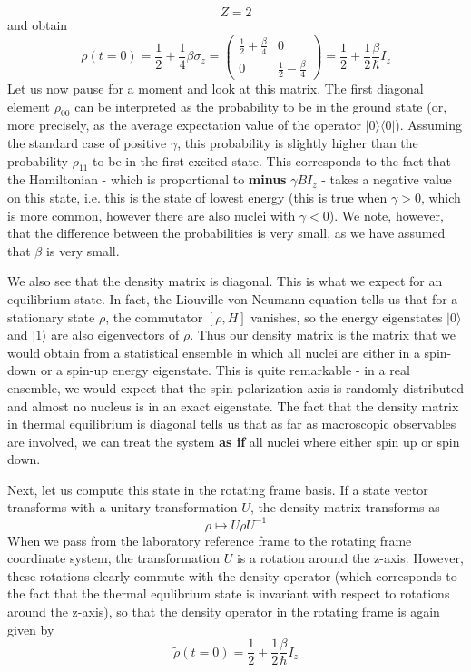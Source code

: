 \documentclass[a4paper, draft]{article}
\theoremstyle{own}
\theoremstyle{remark}
\begin{document}
$$
Z = 2
$$
and obtain
$$
\rho(t=0) = \frac{1}{2} + \frac{1}{4} \beta \sigma_z =
\begin{pmatrix}
\frac{1}{2} + \frac{\beta}{4} & 0 \\
0 & \frac{1}{2} - \frac{\beta}{4}
\end{pmatrix} = \frac{1}{2} + \frac{1}{2} \frac{\beta}{\hbar} I_z
$$
Let us now pause for a moment and look at this matrix. The first diagonal element $\rho_{00}$ can be interpreted as the probability to be in the ground state (or, more precisely, as the average expectation value of the operator $|0 \rangle \langle 0 |$). Assuming the standard case of positive $\gamma$, this probability is slightly higher than the probability $\rho_{11}$ to be in the first excited state. This corresponds to the fact that the Hamiltonian - which is proportional to {\bf minus} $\gamma B I_z$ - takes a negative value on this state, i.e. this is the state of lowest energy (this is true when $\gamma > 0$, which is more common, however there are also nuclei with $\gamma < 0$). We note, however, that the difference between the probabilities is very small, as we have assumed that $\beta$ is very small. 

We also see that the density matrix is diagonal. This is what we expect for an equilibrium state. In fact, the Liouville-von Neumann equation tells us that for a stationary state $\rho$, the commutator $[\rho, H]$ vanishes, so the energy eigenstates $|0 \rangle$ and $|1 \rangle$ are also eigenvectors of $\rho$. Thus our density matrix is the matrix that we would obtain from a statistical ensemble in which all nuclei are either in a spin-down or a spin-up energy eigenstate. This is quite remarkable - in a real ensemble, we would expect that the spin polarization axis is randomly distributed and almost no nucleus is in an exact eigenstate. The fact that the density matrix in thermal equilibrium is diagonal tells us that as far as macroscopic observables are involved, we can treat the system {\bf as if} all nuclei where either spin up or spin down. 

Next, let us compute this state in the rotating frame basis. If a state vector transforms with a unitary transformation $U$, the density matrix transforms as
$$
\rho \mapsto U \rho U^{-1}
$$
When we pass from the laboratory reference frame to the rotating frame coordinate system, the transformation $U$ is a rotation around the z-axis. However, these rotations clearly commute with the density operator (which corresponds to the fact that the thermal equlibrium state is invariant with respect to rotations around the z-axis), so that the density operator in the rotating frame is again given by
$$
\widetilde{\rho} (t=0) = \frac{1}{2} + \frac{1}{2} \frac{\beta}{\hbar} I_z
$$
\end{document}
